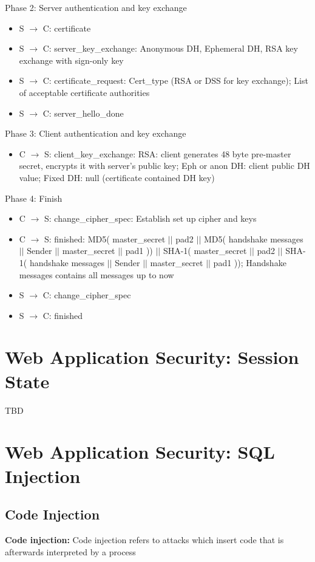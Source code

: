 \documentclass[fs, footer]{latex4ei}
\begin{document}
\begin{multicols*}{4}
Phase 2:  Server  authentication    and key exchange
\begin{itemize}
	\item S $\rightarrow$ C:  certificate  
	\item S $\rightarrow$ C:  server\_key\_exchange: Anonymous DH, Ephemeral   DH, RSA key exchange    with    sign-only   key 
	\item S $\rightarrow$ C:  certificate\_request: Cert\_type (RSA    or  DSS for key exchange); List  of  acceptable  certificate  authorities  
	\item S $\rightarrow$ C:  server\_hello\_done
\end{itemize}

Phase 3:  Client  authentication and key exchange 
\begin{itemize}
	\item C $\rightarrow$ S: client\_key\_exchange: RSA: client generates 48  byte pre-master  secret, encrypts it  with server’s 
	public  key; Eph or  anon DH: client  public  DH  value; Fixed DH: null (certificate contained DH  key)   
\end{itemize}

Phase 4: Finish 
\begin{itemize}
	\item C $\rightarrow$ S: change\_cipher\_spec: Establish set up cipher and keys 
	\item C $\rightarrow$ S: finished: MD5( master\_secret $||$ pad2 $||$ MD5( handshake messages $||$ Sender $||$ master\_secret $||$ pad1 )) $||$ SHA-1( master\_secret $||$ pad2 $||$ SHA-1( handshake messages $||$ Sender $||$ master\_secret $||$ pad1 )); Handshake messages contains all messages up to now 
	\item S $\rightarrow$ C: change\_cipher\_spec
	\item S $\rightarrow$ C: finished 
\end{itemize}

\section{Web Application Security: Session State}
TBD
\section{Web Application Security: SQL Injection}

\subsection{Code Injection} 
\textbf{Code injection:} Code injection refers to attacks which insert code that is afterwards interpreted by a process


\end{multicols*}
\end{document}
